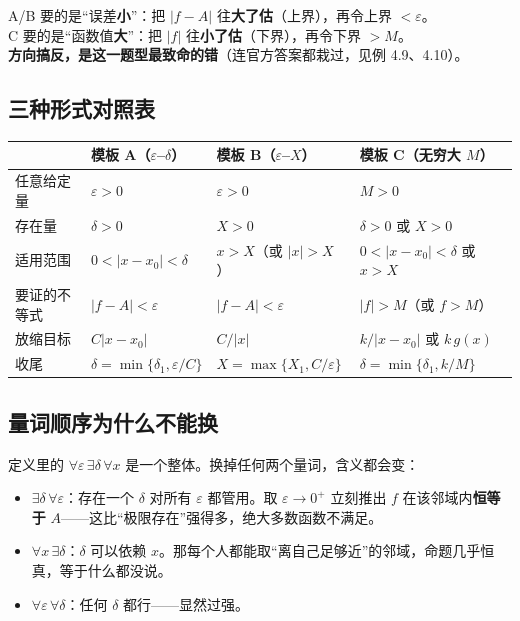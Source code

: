 \documentclass[11pt,a4paper]{ctexart}
\newcommand{\eps}{\varepsilon}
\newcommand{\abs}[1]{\left\lvert #1\right\rvert}
\begin{document}
\begin{warnbox}[方向和 A/B 相反]
A/B 要的是“误差\textbf{小}”：把 $\abs{f-A}$ 往\textbf{大了估}（上界），再令上界 $<\eps$。\\
C 要的是“函数值\textbf{大}”：把 $\abs{f}$ 往\textbf{小了估}（下界），再令下界 $>M$。\\
\textbf{方向搞反，是这一题型最致命的错}（连官方答案都栽过，见例 4.9、4.10）。
\end{warnbox}

\subsection{三种形式对照表}

\begin{center}
\small
\begin{tabular}{@{}llll@{}}
\toprule
 & 模板 A（$\eps$--$\delta$） & 模板 B（$\eps$--$X$） & 模板 C（无穷大 $M$） \\
\midrule
任意给定量 & $\eps>0$ & $\eps>0$ & $M>0$ \\
存在量 & $\delta>0$ & $X>0$ & $\delta>0$ 或 $X>0$ \\
适用范围 & $0<\abs{x-x_0}<\delta$ & $x>X$（或 $\abs{x}>X$） & $0<\abs{x-x_0}<\delta$ 或 $x>X$ \\
要证的不等式 & $\abs{f-A}<\eps$ & $\abs{f-A}<\eps$ & $\abs{f}>M$（或 $f>M$） \\
放缩目标 & $C\abs{x-x_0}$ & $C/\abs{x}$ & $k/\abs{x-x_0}$ 或 $k\,g(x)$ \\
收尾 & $\delta=\min\{\delta_1,\eps/C\}$ & $X=\max\{X_1,C/\eps\}$ & $\delta=\min\{\delta_1,k/M\}$ \\
\bottomrule
\end{tabular}
\end{center}

\subsection{量词顺序为什么不能换}

定义里的 $\forall\eps\,\exists\delta\,\forall x$ 是一个整体。换掉任何两个量词，含义都会变：

\begin{itemize}
\item $\exists\delta\,\forall\eps$：存在一个 $\delta$ 对所有 $\eps$ 都管用。取 $\eps\to0^+$ 立刻推出 $f$ 在该邻域内\textbf{恒等于} $A$——这比“极限存在”强得多，绝大多数函数不满足。
\item $\forall x\,\exists\delta$：$\delta$ 可以依赖 $x$。那每个人都能取“离自己足够近”的邻域，命题几乎恒真，等于什么都没说。
\item $\forall\eps\,\forall\delta$：任何 $\delta$ 都行——显然过强。
\end{itemize}
\end{document}
